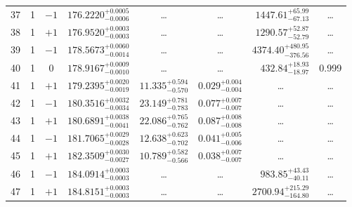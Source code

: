 \begin{table*}[!]
\begin{tabular}{llcrrlrc}
37 & 1 & $-1$ & $    176.2220_{-      0.0006}^{+      0.0005}$ & \multicolumn{1}{c}{\dots} & \multicolumn{1}{c}{\dots} & $     1447.61_{-       67.13}^{+       65.99}$ & \dots \\[1pt]
38 & 1 & $+1$ & $    176.9520_{-      0.0003}^{+      0.0003}$ & \multicolumn{1}{c}{\dots} & \multicolumn{1}{c}{\dots} & $     1290.57_{-       52.79}^{+       52.87}$ & \dots \\[1pt]
39 & 1 & $-1$ & $    178.5673_{-      0.0014}^{+      0.0060}$ & \multicolumn{1}{c}{\dots} & \multicolumn{1}{c}{\dots} & $     4374.40_{-      376.56}^{+      480.95}$ & \dots \\[1pt]
40 & 1 & 0 & $    178.9167_{-      0.0010}^{+      0.0009}$ & \multicolumn{1}{c}{\dots} & \multicolumn{1}{c}{\dots} & $      432.84_{-       18.97}^{+       18.93}$ & 0.999 \\[1pt]
41 & 1 & $+1$ & $    179.2395_{-      0.0019}^{+      0.0020}$ & $      11.335_{-       0.570}^{+       0.594}$ & $       0.029_{-       0.004}^{+       0.004}$ & \multicolumn{1}{c}{\dots} & \dots \\[1pt]
42 & 1 & $-1$ & $    180.3516_{-      0.0034}^{+      0.0032}$ & $      23.149_{-       0.783}^{+       0.781}$ & $       0.077_{-       0.007}^{+       0.007}$ & \multicolumn{1}{c}{\dots} & \dots \\[1pt]
43 & 1 & $+1$ & $    180.6891_{-      0.0041}^{+      0.0038}$ & $      22.086_{-       0.762}^{+       0.765}$ & $       0.087_{-       0.008}^{+       0.008}$ & \multicolumn{1}{c}{\dots} & \dots \\[1pt]
44 & 1 & $-1$ & $    181.7065_{-      0.0028}^{+      0.0029}$ & $      12.638_{-       0.702}^{+       0.623}$ & $       0.041_{-       0.006}^{+       0.005}$ & \multicolumn{1}{c}{\dots} & \dots \\[1pt]
45 & 1 & $+1$ & $    182.3509_{-      0.0027}^{+      0.0030}$ & $      10.789_{-       0.566}^{+       0.582}$ & $       0.038_{-       0.007}^{+       0.007}$ & \multicolumn{1}{c}{\dots} & \dots \\[1pt]
46 & 1 & $-1$ & $    184.0914_{-      0.0003}^{+      0.0003}$ & \multicolumn{1}{c}{\dots} & \multicolumn{1}{c}{\dots} & $      983.85_{-       40.11}^{+       43.43}$ & \dots \\[1pt]
47 & 1 & $+1$ & $    184.8151_{-      0.0003}^{+      0.0003}$ & \multicolumn{1}{c}{\dots} & \multicolumn{1}{c}{\dots} & $     2700.94_{-      164.80}^{+      215.29}$ & \dots \\[1pt]


\end{tabular}
\end{table*}
